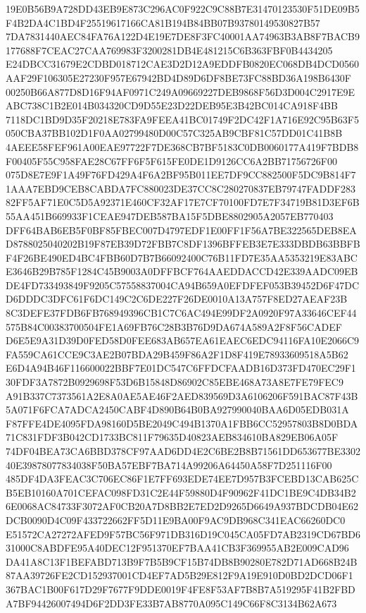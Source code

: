\documentclass[UTF8,fontset=fandol,zihao=-4,a4paper]{ctexart}
\begin{document}
{{19E0B56B9A728DD43EB9E873C296AC0F922C9C88B7E31470123530F51DE09B5F4B2DA4C1BD4F25519617166CA81B194B84BB07B93780149530827B57
7DA7831440AEC84FA76A122D4E19E7DE8F3FC40001AA74963B3AB8F7BACB9177688F7CEAC27CAA769983F3200281DB4E481215C6B363FBF0B4434205
E24DBCC31679E2CDBD018712CAE3D2D12A9EDDFB0820EC068DB4DCD0560AAF29F106305E27230F957E67942BD4D89D6DF8BE73FC88BD36A198B6430F
00250B66A877D8D16F94AF0971C249A09669227DEB9868F56D3D004C2917E9EABC738C1B2E014B034320CD9D55E23D22DEB95E3B42BC014CA918F4BB
7118DC1BD9D35F20218E783FA9FEEA41BC01749F2DC42F1A716E92C95B63F5050CBA37BB102D1F0AA02799480D00C57C325AB9CBF81C57DD01C41B8B
4AEEE58FEF961A00EAE97722F7DE368CB7BF5183C0DB0060177A419F7BDB8F00405F55C958FAE28C67FF6F5F615FE0DE1D9126CC6A2BB71756726F00
075D8E7E9F1A49F76FD429A4F6A2BF95B011EE7DF9CC882500F5DC9B814F71AAA7EBD9CEB8CABDA7FC880023DE37CC8C280270837EB79747FADDF283
82FF5AF71E0C5D5A92371E460CF32AF17E7CF70100FD7E7F34719B81D3EF6B55AA451B669933F1CEAE947DEB587BA15F5DBE8802905A2057EB770403
DFF64BAB6EB5F0BF85FBEC007D4797EDF1E00FF1F56A7BE322565DEB8EAD8788025040202B19F87EB39D72FBB7C8DF1396BFFEB3E7E333DBDB63BBFB
F4F26BE490ED4BC4FBB60D7B7B66092400C76B11FD7E35AA5353219E83ABCE3646B29B785F1284C45B9003A0DFFBCF764AAEDDACCD42E339AADC09EB
DE4FD733493849F9205C57558837004CA94B659A0EFDFEF053B39452D6F47DCD6DDDC3DFC61F6DC149C2C6DE227F26DE0010A13A757F8ED27AEAF23B
8C3DEFE37FDB6FB768949396CB1C7C6AC494E99DF2A0920F97A33646CEF44575B84C00383700504FE1A69FB76C28B3B76D9DA674A589A2F8F56CADEF
D6E5E9A31D39D0FED58D0FEE683AB657EA61EAEC6EDC94116FA10E2066C9FA559CA61CCE9C3AE2B07BDA29B459F86A2F1D8F419E78933609518A5B62
E6D4A94B46F116600022BBF7E01DC547C6FFDCFAADB16D373FD470EC29F130FDF3A7872B0929698F53D6B15848D86902C85EBE468A73A8E7FE79FEC9
A91B337C7373561A2E8A0AE5AE46F2AED839569D3A6106206F591BAC87F43B5A071F6FCA7ADCA2450CABF4D890B64B0BA927990040BAA6D05EDB031A
F87FFE4DE4095FDA98160D5BE2049C494B1370A1FBB6CC52957803B8D0BDA71C831FDF3B042CD1733BC811F79635D40823AEB834610BA829EB06A05F
74DF04BEA73CA6BBD378CF97AAD6DD4E2C6BE2B8B71561DD653677BE330240E39878077834038F50BA57EBF7BA714A99206A64450A58F7D251116F00
485DF4DA3FEAC3C706EC86F1E7FF693EDE74EE7D957B3FCEBD13CAB625CB5EB10160A701CEFAC098FD31C2E44F59880D4F90962F41DC1BE9C4DB34B2
6E0068AC84733F3072AF0CB20A7D8BB2E7ED2D9265D6649A937BDCDB04E62DCB0090D4C09F433722662FF5D11E9BA00F9AC9DB968C341EAC66260DC0
E51572CA27272AFED9F57BC56F971DB316D19C045CA05FD7AB2319CD67BD631000C8ABDFE95A40DEC12F951370EF7BAA41CB3F369955AB2E009CAD96
DA41A8C13F1BEFABD713B9F7B5B9CF15B74DB8B90280E782D71AD668B24B87AA39726FE2CD152937001CD4EF7AD5B29E812F9A19E910D0BD2DCD06F1
367BAC1B00F617D29F7677F9DDE0019F4FE8F53AF7B8B7A519295F41B2FBDA7BF94426007494D6F2DD3FE33B7AB8770A095C149C66F8C3134B62A673
}}
\end{document}
